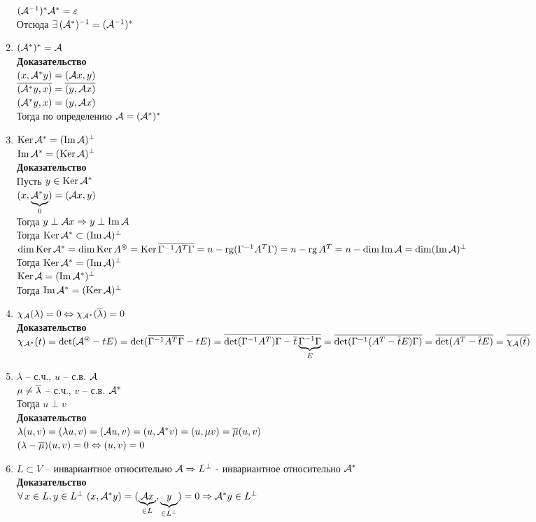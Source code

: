 \documentclass[12pt]{article}
\begin{document}
\begin{enumerate}
        $(\mcA^{-1})^* \mcA^* = \eps $\\
        Отсюда $\ex (\mcA^*)^{-1} = (\mcA^{-1})^* $
    \item $(\mcA^*)^* = \mcA $\\
        \textbf{Доказательство}\\
        $(x, \mcA^* y) = (\mcA x, y) $\\
        $\ol{(\mcA^* y, x)} = \ol{(y, \mcA x)} $\\
        $(\mcA^* y, x) = (y, \mcA x)$\\
        Тогда по определению $\mcA = (\mcA^*)^* $
    \item $\ker \mcA^* = (\im \mcA)^\perp $\\
        $\im \mcA^* = (\ker \mcA)^\perp $\\
        \textbf{Доказательство}\\
        Пусть $y \in \ker \mcA^*$\\
        $(x, \ub{0}{\mcA^* y}) = (\mcA x, y)$\\
        Тогда $y \perp \mcA x \Rto y \perp \im \mcA $\\
        Тогда $\ker \mcA^* \subset (\im \mcA)^\perp $\\
        $\dim \ker \mcA^* = \dim \ker A^{\circledast} = \ker \ol{ \Gamma^{-1} A^T \Gamma} = n - \rg( \Gamma^{-1}A^T \Gamma) = n - \rg A^T = n - \dim \im \mcA = \dim (\im \mcA)^\perp$\\
        Тогда $\ker \mcA^* = (\im \mcA)^\perp $\\
        $\ker \mcA = (\im \mcA^*)^\perp$\\
        Тогда $\im \mcA^* = (\ker \mcA)^\perp$
    \item $\chi_{\mcA}( \lambda) = 0 \LRto \chi_{\mcA^*} (\ol\lambda) = 0$\\
        \textbf{Доказательство}\\
        $\chi_{\mcA^*}(t) = \det (\mcA^{\circledast} - tE) = \det(\ol{ \Gamma^{-1}A^T \Gamma} - tE) = \ol{\det( \Gamma^{-1}A^T) \Gamma  - \ol t \ub{E}{\Gamma^{-1} \Gamma}} = \ol{\det( \Gamma^{-1}(A^T - \ol tE) \Gamma)} = \ol{\det (A^T - \ol t E)}  = \ol {\chi_\mcA(\ol t)} $
    \item $ \lambda$ -- с.ч., $u$ -- с.в. $\mcA$\\
        $\mu \neq \ol \lambda$ -- с.ч., $v$ -- с.в. $\mcA^*$\\
        Тогда $u \perp v$\\
        \textbf{Доказательство}\\
        $ \lambda(u, v) = ( \lambda u, v) = (\mcA u, v) = (u, \mcA^* v) = (u, \mu v) = \ol \mu (u, v)$\\
        $( \lambda - \ol \mu)(u, v) = 0 \LRto (u, v) = 0$
    \item $L \subset V$ -- инвариантное относительно $\mcA \Rto L^\perp$ - инвариантное относительно $\mcA^*$\\
        \textbf{Доказательство}\\
        $\fall x \in L, y \in L^\perp\ (x, \mcA^* y) = (\ub{\in L}{\mcA x}, \ub{\in L^\perp}y) = 0 \Rto \mcA^* y \in L^\perp$
\end{enumerate}
\end{document}

